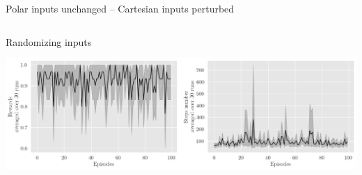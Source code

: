 \documentclass[bigger]{beamer}
\begin{document}
\begin{frame}[label={sec:org4507a69}]{Polar inputs unchanged -- Cartesian inputs perturbed}
\begin{columns}
\begin{column}[c]{0.5\columnwidth}
\begin{center}
\end{center}
\begin{center}
\footnotesize
Randomizing inputs
\end{center}
\begin{center}
\includegraphics[width=\textwidth]{medias/LeftRight/exp_keep-polar_silence-False.png}
\end{center}
\end{column}
\end{columns}
\end{frame}
\end{document}
